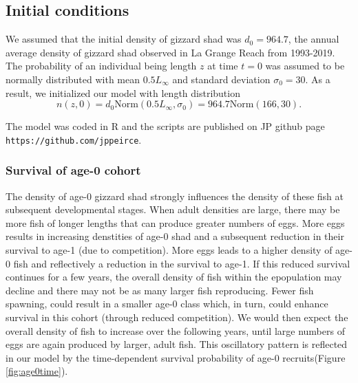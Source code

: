 \documentclass[preprint,review,12pt,authoryear]{elsarticle}
\begin{document}
\subsection{Initial conditions}  We assumed that the initial density of gizzard shad was $d_0 = 964.7$, the annual average density of gizzard shad observed in La Grange Reach from 1993-2019.  
The probability of an individual being length $z$ at time $t=0$  was assumed to be normally distributed with mean $0.5L_\infty$ and standard deviation $\sigma_0 = 30$.  
As a result, we initialized our model with length distribution
\begin{equation}\label{eq:n}
 n(z,0) = d_0 \mbox{Norm} (0.5 L_\infty, \sigma_0) = 964.7 \mbox{Norm} (166, 30). 
 \end{equation}

The model was coded in R \citep{R} and the scripts are published on JP github page \verb+https://github.com/jppeirce+.

\subsubsection{Survival of age-0 cohort} \label{sec:survival}

The density of age-0 gizzard shad strongly influences the density of these fish at subsequent developmental stages.
When adult densities are large, there may be more fish of longer lengths that can produce greater numbers of eggs.  More eggs results in increasing denstities of age-0 shad and a subsequent reduction in their survival to age-1 (due to competition).  More eggs leads to a higher density of age-0 fish and reflectively a reduction in the survival to age-1. 
If this reduced survival continues for a few years, the overall density of fish within the epopulation may decline and there may not be as many larger fish reproducing.  
Fewer fish spawning, could result in a smaller age-0 class which, in turn, could enhance survival in this cohort (through reduced competition). We would then expect the overall density of fish to increase over the following years, until large numbers of eggs are again produced by larger, adult fish.  
This oscillatory pattern is reflected in our model by the time-dependent survival probability of age-0 recruits(Figure \ref{fig:age0time}).
\end{document}

